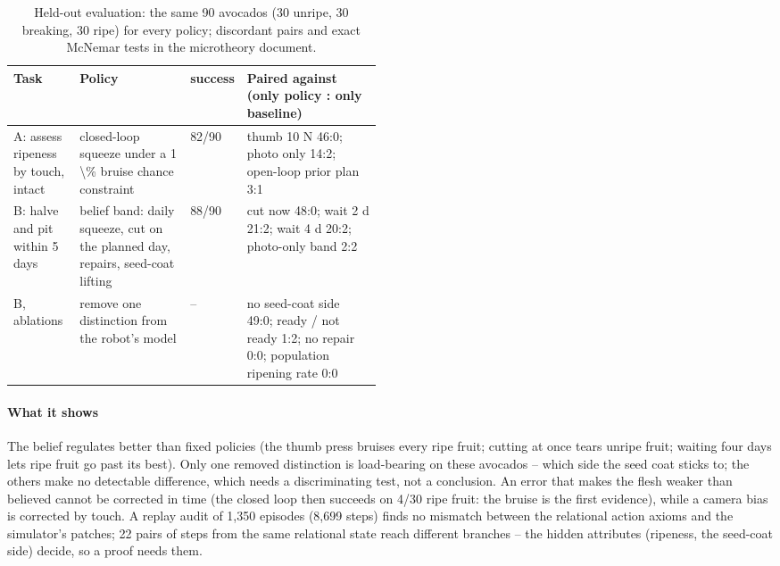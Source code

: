 \documentclass[10.5pt,a4paper]{article}
\begin{document}
\begin{table}[htbp]\centering\scriptsize\caption{Held-out evaluation: the same 90 avocados (30 unripe, 30 breaking, 30 ripe) for every policy; discordant pairs and exact McNemar tests in the microtheory document.}
\begin{tabularx}{\linewidth}{@{}p{0.18\linewidth}p{0.3\linewidth}lX@{}}\toprule Task & Policy & success & Paired against (only policy : only baseline) \\\midrule
A: assess ripeness by touch, intact & closed-loop squeeze under a 1 \textbackslash{}\% bruise chance constraint & 82/90 & thumb 10 N 46:0; photo only 14:2; open-loop prior plan 3:1 \\
B: halve and pit within 5 days & belief band: daily squeeze, cut on the planned day, repairs, seed-coat lifting & 88/90 & cut now 48:0; wait 2 d 21:2; wait 4 d 20:2; photo-only band 2:2 \\
B, ablations & remove one distinction from the robot's model & -- & no seed-coat side 49:0; ready / not ready 1:2; no repair 0:0; population ripening rate 0:0 \\\bottomrule\end{tabularx}\end{table}
\paragraph{What it shows} The belief regulates better than fixed policies (the thumb press bruises every ripe
fruit; cutting at once tears unripe fruit; waiting four days lets ripe fruit go past its best). Only one removed
distinction is load-bearing on these avocados -- which side the seed coat sticks to; the others make no detectable
difference, which needs a discriminating test, not a conclusion. An error that makes the flesh weaker than believed
cannot be corrected in time (the closed loop then succeeds on 4/30 ripe fruit: the bruise is
the first evidence), while a camera bias is corrected by touch. A replay audit of 1,350 episodes (8,699 steps) finds no mismatch between the relational action axioms and the
simulator's patches; 22 pairs of steps from the same relational state reach different
branches -- the hidden attributes (ripeness, the seed-coat side) decide, so a proof needs them.
\end{document}
